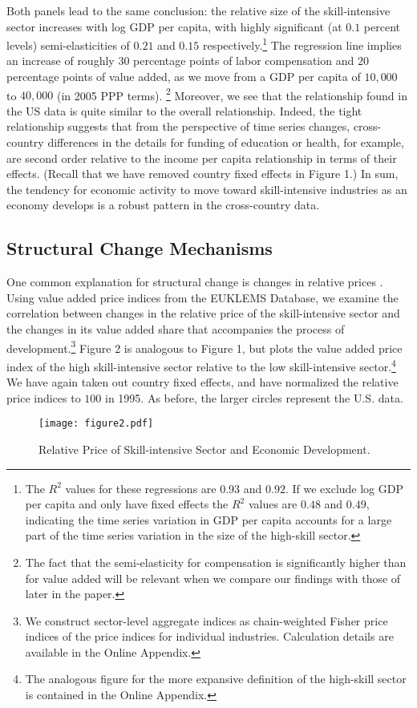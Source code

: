 \documentclass[12pt,english]{article}
\begin{document}
Both panels lead to the same conclusion: the relative size of the
skill-intensive sector increases with log GDP per capita, with highly
significant (at $0.1$ percent levels) semi-elasticities of $0.21$ and $0.15$
respectively.\footnote{%
The $R^2$ values for these regressions are $0.93$ and $0.92$. If we exclude
log GDP per capita and only have fixed effects the $R^2$ values are $0.48$
and $0.49$, indicating the time series variation in GDP per capita accounts
for a large part of the time series variation in the size of the high-skill
sector.} The regression line implies an increase of roughly $30$ percentage
points of labor compensation and $20$ percentage points of value added, as
we move from a GDP per capita of $10,000$ to $40,000$ (in 2005 PPP terms).%
\footnote{%
The fact that the semi-elasticity for compensation is significantly higher
than for value added will be relevant when we compare our findings with
those of \citet{KatMur92} later in the paper.} Moreover, we see that the
relationship found in the US data is quite similar to the overall
relationship. Indeed, the tight relationship suggests that from the
perspective of time series changes, cross-country differences in the details
for funding of education or health, for example, are second order relative
to the income per capita relationship in terms of their effects. (Recall
that we have removed country fixed effects in Figure 1.) In sum, the
tendency for economic activity to move toward skill-intensive industries as
an economy develops is a robust pattern in the cross-country data.

\subsection{Structural Change Mechanisms}

One common explanation for structural change is changes in relative prices %
\citep[see, for example,][]{Bau67,NgaPis07}. Using value added price indices
from the EUKLEMS Database, we examine the correlation between changes in the
relative price of the skill-intensive sector and the changes in its value
added share that accompanies the process of development.\footnote{%
We construct sector-level aggregate indices as chain-weighted Fisher price
indices of the price indices for individual industries. Calculation details
are available in the Online Appendix.} Figure 2 is analogous to Figure 1,
but plots the value added price index of the high skill-intensive sector
relative to the low skill-intensive sector.\footnote{%
The analogous figure for the more expansive definition of the high-skill
sector is contained in the Online Appendix.} We have again taken out country
fixed effects, and have normalized the relative price indices to $100$ in
1995. As before, the larger circles represent the U.S. data. 
\begin{figure}[tbh]
\caption{ Relative Price of Skill-intensive Sector and Economic Development.}
\label{fig_2}
\smallskip \centering
\begin{minipage}{0.85\textwidth}
\texttt{[image: figure2.pdf]}
\end{minipage}
\end{figure}
\end{document}
